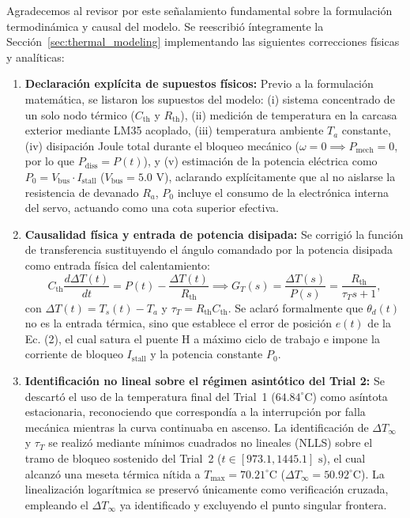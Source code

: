\documentclass{LabDSTresponse}
\begin{document}
{Agradecemos al revisor por este señalamiento fundamental sobre la formulación termodinámica y causal del modelo. Se reescribió íntegramente la Sección~\ref{sec:thermal_modeling} implementando las siguientes correcciones físicas y analíticas:
\begin{enumerate}
    \item \textbf{Declaración explícita de supuestos físicos:} Previo a la formulación matemática, se listaron los supuestos del modelo: (i) sistema concentrado de un solo nodo térmico ($C_{\text{th}}$ y $R_{\text{th}}$), (ii) medición de temperatura en la carcasa exterior mediante LM35 acoplado, (iii) temperatura ambiente $T_a$ constante, (iv) disipación Joule total durante el bloqueo mecánico ($\omega = 0 \implies P_{\text{mech}} = 0$, por lo que $P_{\text{diss}} = P(t)$), y (v) estimación de la potencia eléctrica como $P_0 = V_{\text{bus}} \cdot I_{\text{stall}}$ ($V_{\text{bus}} = 5.0\text{ V}$), aclarando explícitamente que al no aislarse la resistencia de devanado $R_a$, $P_0$ incluye el consumo de la electrónica interna del servo, actuando como una cota superior efectiva.
    \item \textbf{Causalidad física y entrada de potencia disipada:} Se corrigió la función de transferencia sustituyendo el ángulo comandado por la potencia disipada como entrada física del calentamiento:
    \begin{equation*}
        C_{\text{th}}\frac{d\Delta T(t)}{dt} = P(t) - \frac{\Delta T(t)}{R_{\text{th}}} \implies G_T(s) = \frac{\Delta T(s)}{P(s)} = \frac{R_{\text{th}}}{\tau_T s + 1},
    \end{equation*}
    con $\Delta T(t) = T_s(t) - T_a$ y $\tau_T = R_{\text{th}}C_{\text{th}}$. Se aclaró formalmente que $\theta_d(t)$ no es la entrada térmica, sino que establece el error de posición $e(t)$ de la Ec. (2), el cual satura el puente H a máximo ciclo de trabajo e impone la corriente de bloqueo $I_{\text{stall}}$ y la potencia constante $P_0$.
    \item \textbf{Identificación no lineal sobre el régimen asintótico del Trial 2:} Se descartó el uso de la temperatura final del Trial~1 ($64.84^\circ\text{C}$) como asíntota estacionaria, reconociendo que correspondía a la interrupción por falla mecánica mientras la curva continuaba en ascenso. La identificación de $\Delta T_\infty$ y $\tau_T$ se realizó mediante mínimos cuadrados no lineales (NLLS) sobre el tramo de bloqueo sostenido del Trial~2 ($t \in [973.1, 1445.1]\text{ s}$), el cual alcanzó una meseta térmica nítida a $T_{\max} = 70.21^\circ\text{C}$ ($\Delta T_\infty = 50.92^\circ\text{C}$). La linealización logarítmica se preservó únicamente como verificación cruzada, empleando el $\Delta T_\infty$ ya identificado y excluyendo el punto singular frontera.

\end{enumerate}}
\end{document}
